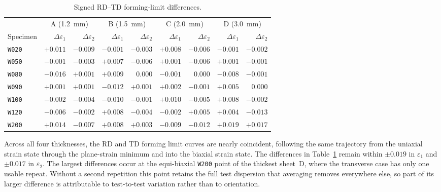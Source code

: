 \begin{table}[p]
    \centering
    \small
    \setlength{\tabcolsep}{4pt}
    \begin{tabular}{l rr rr rr rr}
        \toprule
        & \multicolumn{2}{c}{A (\SI{1.2}{\milli\meter})}
        & \multicolumn{2}{c}{B (\SI{1.5}{\milli\meter})}
        & \multicolumn{2}{c}{C (\SI{2.0}{\milli\meter})}
        & \multicolumn{2}{c}{D (\SI{3.0}{\milli\meter})} \\
        \cmidrule(lr){2-3}\cmidrule(lr){4-5}\cmidrule(lr){6-7}\cmidrule(lr){8-9}
        Specimen & $\Delta\varepsilon_1$ & $\Delta\varepsilon_2$
        & $\Delta\varepsilon_1$ & $\Delta\varepsilon_2$
        & $\Delta\varepsilon_1$ & $\Delta\varepsilon_2$
        & $\Delta\varepsilon_1$ & $\Delta\varepsilon_2$ \\
        \midrule
        \texttt{W020} & $+0.011$ & $-0.009$ & $-0.001$ & $-0.003$ & $+0.008$ & $-0.006$ & $-0.001$ & $-0.002$ \\
        \texttt{W050} & $-0.001$ & $-0.003$ & $+0.007$ & $-0.006$ & $+0.001$ & $-0.006$ & $+0.001$ & $-0.001$ \\
        \texttt{W080} & $-0.016$ & $+0.001$ & $+0.009$ & $0.000$ & $-0.001$ & $0.000$ & $-0.008$ & $-0.001$ \\
        \texttt{W090} & $+0.001$ & $+0.001$ & $-0.012$ & $+0.001$ & $+0.002$ & $-0.001$ & $+0.005$ & $0.000$ \\
        \texttt{W100} & $-0.002$ & $-0.004$ & $-0.010$ & $-0.001$ & $+0.010$ & $-0.005$ & $+0.008$ & $-0.002$ \\
        \texttt{W120} & $-0.006$ & $-0.002$ & $+0.008$ & $-0.004$ & $-0.002$ & $+0.005$ & $+0.004$ & $-0.013$ \\
        \texttt{W200} & $+0.014$ & $-0.007$ & $+0.008$ & $+0.003$ & $-0.009$ & $-0.012$ & $+0.019$ & $+0.017$ \\
        \bottomrule
    \end{tabular}
    \caption{Signed RD--TD forming-limit differences.}
    \label{tab:rd_td_summary}
\end{table}

Across all four thicknesses, the RD and TD forming limit curves are nearly
coincident, following the same trajectory from the uniaxial strain state through the
plane-strain minimum and into the biaxial strain state. The differences in
Table~\ref{tab:rd_td_summary} remain within $\pm0.019$ in $\varepsilon_1$ and
$\pm0.017$ in $\varepsilon_2$. The largest differences
occur at the equi-biaxial \texttt{W200} point of the thickest sheet~D, where the transverse case has only one usable repeat. Without a second repetition this point retains the full test dispersion that averaging removes everywhere else, so part of its larger difference is attributable to test-to-test variation rather than to orientation. 

